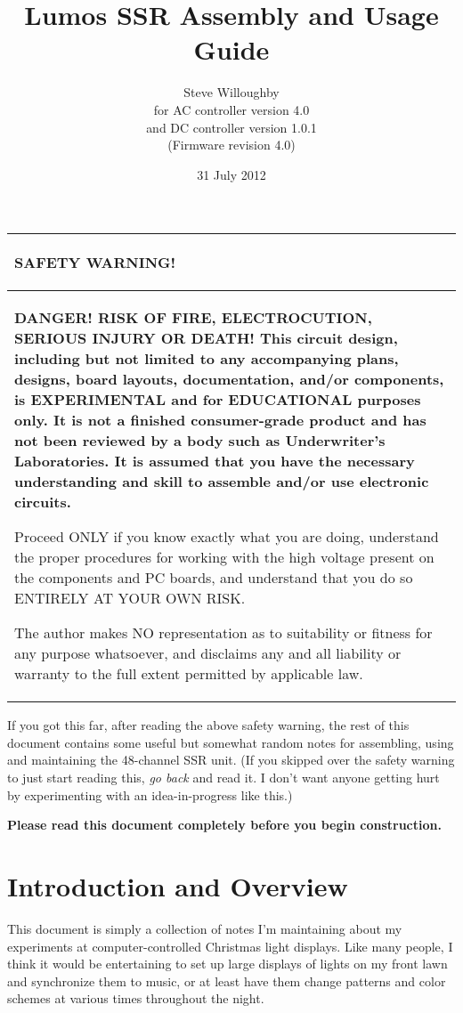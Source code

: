 \documentclass[12pt]{article}
\newcommand\mc[1]{{\small #1}}
\begin{document}
\title{Lumos SSR Assembly and Usage Guide}
\author{Steve Willoughby \\ for AC controller version 4.0 \\ and DC controller version 1.0.1 \\ (Firmware revision 4.0)}
\date{31 July 2012}
\maketitle
\tableofcontents
\begin{center}
\begin{tabular}{|p{4.5in}|}\hline
{\large\bf\strut SAFETY WARNING!}\\\hline
\bf \mc{DANGER!  RISK OF FIRE, ELECTROCUTION, SERIOUS    
INJURY OR DEATH!}  This circuit design, including 
but not limited to any accompanying plans,       
designs, board layouts, documentation, and/or    
components, is \mc{EXPERIMENTAL} and for \mc{EDUCATIONAL}
purposes only.  It is not a finished consumer-grade product
and has not been reviewed by a body such as Underwriter's
Laboratories.  It is assumed that you have the necessary 
understanding and skill to assemble and/or use electronic
circuits.

Proceed \mc{ONLY} if you know exactly what you are    
doing, understand the proper procedures for      
working with the high voltage present on the     
components and PC boards, and understand that    
you do so \mc{ENTIRELY AT YOUR OWN RISK.}

The author makes \mc{NO}
representation as to suitability or fitness for  
any purpose whatsoever, and disclaims any and all    
liability or warranty to the full extent permitted
by applicable law.\\\hline
\end{tabular}
\end{center}

If you got this far, after reading the above safety warning, the rest of this
document contains some useful but somewhat random notes for assembling, using
and maintaining the 48-channel SSR unit.  (If you skipped over the safety 
warning to just start reading this, {\em go back\/} and read it.  I don't want anyone
getting hurt by experimenting with an idea-in-progress like this.)

{\bf Please read this document completely before you begin construction.}

\newpage

\section{Introduction and Overview}
This document is simply a collection of notes I'm maintaining about my
experiments at computer-controlled Christmas light displays.  Like many
people, I think it would be entertaining to set up large
displays of lights on my front lawn and synchronize them to music, or at
least have them change patterns and color schemes at various times
throughout the night.
\end{document}
